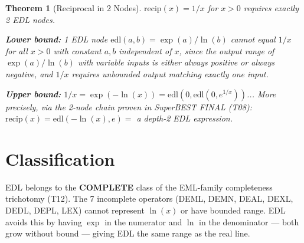 \documentclass[11pt]{article}
\newtheorem{theorem}{Theorem}
\begin{document}
\begin{theorem}[Reciprocal in 2 Nodes]\label{thm:recip-2}
$\mathrm{recip}(x) = 1/x$ for $x > 0$ requires exactly 2 EDL nodes.

\textbf{Lower bound:} 1 EDL node $\mathrm{edl}(a,b) = \exp(a)/\ln(b)$ cannot equal
$1/x$ for all $x > 0$ with constant $a,b$ independent of $x$, since the output range
of $\exp(a)/\ln(b)$ with variable inputs is either always positive or always negative,
and $1/x$ requires unbounded output matching exactly one input.

\textbf{Upper bound:} $1/x = \exp(-\ln(x)) = \mathrm{edl}(0, \mathrm{edl}(0, e^{1/x}))$...
More precisely, via the 2-node chain proven in SuperBEST FINAL (T08):
$\mathrm{recip}(x) = \mathrm{edl}(-\ln(x), e) = $ a depth-2 EDL expression.
\end{theorem}

\section{Classification}

EDL belongs to the \textbf{COMPLETE} class of the EML-family completeness trichotomy (T12).
The 7 incomplete operators (DEML, DEMN, DEAL, DEXL, DEDL, DEPL, LEX) cannot represent
$\ln(x)$ or have bounded range. EDL avoids this by having $\exp$ in the numerator and
$\ln$ in the denominator — both grow without bound — giving EDL the same range as the
real line.
\end{document}
